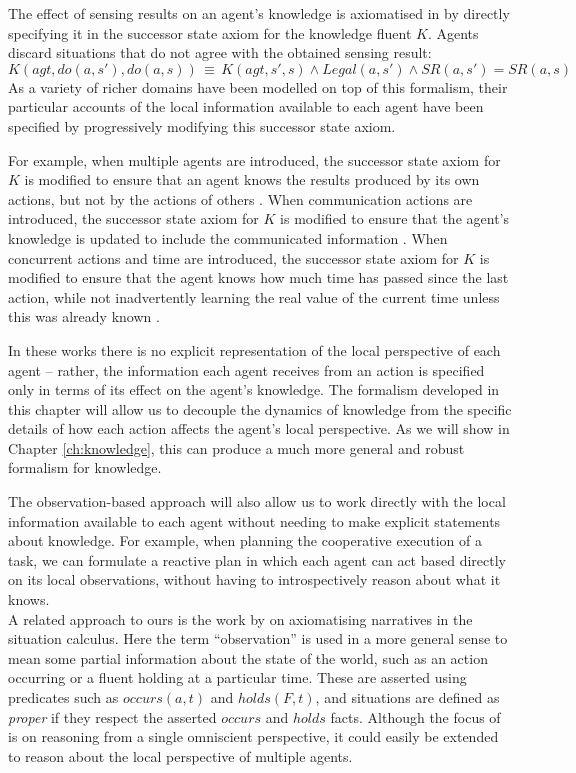 The effect of sensing results on an agent's knowledge is axiomatised
in \citep{scherl03sc_knowledge} by directly specifying it in the
successor state axiom for the knowledge fluent $K$. Agents discard
situations that do not agree with the obtained sensing result:\[
K(agt,do(a,s'),do(a,s))\,\equiv\, K(agt,s',s)\wedge Legal(a,s')\wedge SR(a,s')=SR(a,s)\]
 As a variety of richer domains have been modelled on top of this
formalism, their particular accounts of the local information available
to each agent have been specified by progressively modifying this
successor state axiom.

For example, when multiple agents are introduced, the successor state
axiom for $K$ is modified to ensure that an agent knows the results
produced by its own actions, but not by the actions of others \citep{shapiro98specifying_ma_systems}.
When communication actions are introduced, the successor state axiom
for $K$ is modified to ensure that the agent's knowledge is updated
to include the communicated information \citep{shapiro01casl_feat_inter,shapiro07sc_goal_change}.
When concurrent actions and time are introduced, the successor state
axiom for $K$ is modified to ensure that the agent knows how much
time has passed since the last action, while not inadvertently learning
the real value of the current time unless this was already known \citep{scherl03conc_knowledge}.

In these works there is no explicit representation of the local perspective
of each agent -- rather, the information each agent receives from
an action is specified only in terms of its effect on the agent's
knowledge. The formalism developed in this chapter will allow us to
decouple the dynamics of knowledge from the specific details of how
each action affects the agent's local perspective. As we will show
in Chapter \ref{ch:knowledge}, this can produce a much more general
and robust formalism for knowledge.

The observation-based approach will also allow us to work directly
with the local information available to each agent without needing
to make explicit statements about knowledge. For example, when planning
the cooperative execution of a task, we can formulate a reactive plan
in which each agent can act based directly on its local observations,
without having to introspectively reason about what it knows.\\


A related approach to ours is the work by \citet{pinto98sc_observations}
on axiomatising narratives in the situation calculus. Here the term
{}``observation'' is used in a more general sense to mean some partial
information about the state of the world, such as an action occurring
or a fluent holding at a particular time. These are asserted using
predicates such as $occurs(a,t)$ and $holds(F,t)$, and situations
are defined as \emph{proper} if they respect the asserted $occurs$
and $holds$ facts. Although the focus of \citep{pinto98sc_observations}
is on reasoning from a single omniscient perspective, it could easily
be extended to reason about the local perspective of multiple agents.

